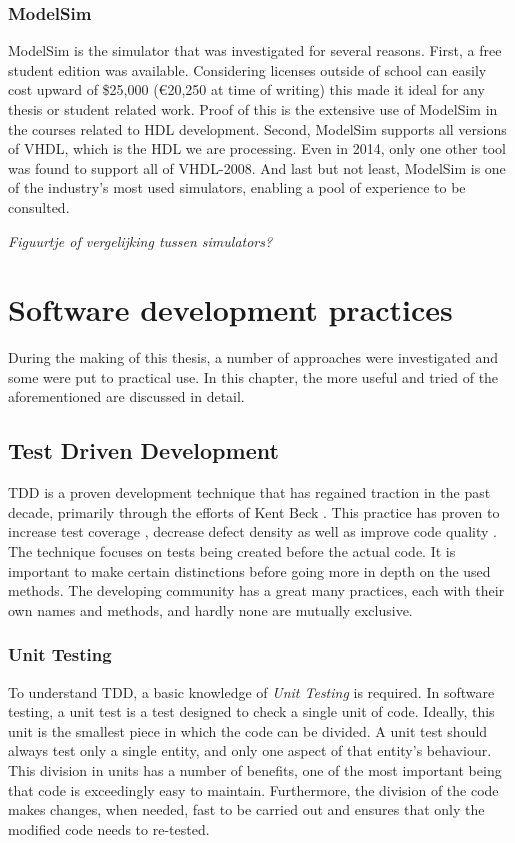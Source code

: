 \documentclass[11pt,british]{article}
\begin{document}
\subsubsection{ModelSim}
ModelSim is the simulator that was investigated for several reasons. First, a free student edition was available. Considering licenses  outside of school can easily cost upward of \$25,000 (\euro20,250 at time of writing) this made it ideal for any thesis or student related work. Proof of this is the extensive use of ModelSim in the courses related to HDL development. Second, ModelSim supports all versions of \gls{VHDL}, which is the \gls{HDL} we are processing. Even in 2014, only one other tool was found to support all of VHDL-2008. And last but not least, ModelSim is one of the industry's most used simulators, enabling a pool of experience to be consulted.

\emph{\color{red}Figuurtje of vergelijking tussen simulators?}


\section{Software development practices}
During the making of this thesis, a number of approaches were investigated and some were put to practical use. In this chapter, the more useful and tried of the aforementioned are discussed in detail.


\subsection{Test Driven Development}
\gls{TDD} is a proven development technique that has regained traction in the past decade, primarily through the efforts of Kent Beck \cite{VHDLUnit}. This practice has proven to increase test coverage \cite{Siniaalto:2007:CCS:1302496.1302946}, decrease defect density \cite{TDDinpractice} as well as improve code quality \cite{TDDinpractice,conf/isese/BhatN06}. The technique focuses on tests being created before the actual code. It is important to make certain distinctions before going more in depth on the used methods. The developing community has a great many practices, each with their own names and methods, and hardly none are mutually exclusive.

\subsubsection{Unit Testing}
To understand \gls{TDD}, a basic knowledge of \emph{Unit Testing} is required. In software testing, a unit test is a test designed to check a single unit of code. Ideally, this unit is the smallest piece in which the code can be divided. A unit test should always test only a single entity, and only one aspect of that entity's behaviour. This division in units has a number of benefits, one of the most important being that code is exceedingly easy to maintain. Furthermore, the division of the code makes changes, when needed, fast to be carried out and ensures that only the modified code needs to re-tested.
\end{document}
